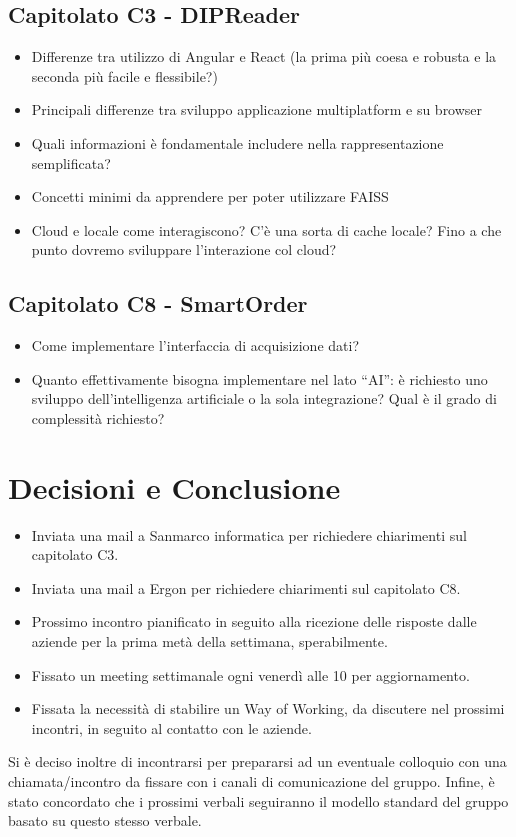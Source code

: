 \documentclass[a4paper,12pt]{article}
\begin{document}
\subsection{Capitolato C3 - DIPReader}
\begin{itemize}
    \item Differenze tra utilizzo di Angular e React (la prima più coesa e robusta e la seconda più facile e flessibile?)
    \item Principali differenze tra sviluppo applicazione multiplatform e su browser
    \item Quali informazioni è fondamentale includere nella rappresentazione semplificata?
    \item Concetti minimi da apprendere per poter utilizzare FAISS
    \item Cloud e locale come interagiscono? C'è una sorta di cache locale? Fino a che punto dovremo sviluppare l'interazione col cloud?
\end{itemize}

\subsection{Capitolato C8 - SmartOrder}
\begin{itemize}
    \item Come implementare l'interfaccia di acquisizione dati?
    \item Quanto effettivamente bisogna implementare nel lato “AI”: è richiesto uno sviluppo dell’intelligenza artificiale o la sola integrazione? Qual è il grado di complessità richiesto?
\end{itemize}

\vspace{0.5cm}
\section{Decisioni e Conclusione}
\begin{itemize}
    \item Inviata una mail a Sanmarco informatica per richiedere chiarimenti sul capitolato C3.
    \item Inviata una mail a Ergon per richiedere chiarimenti sul capitolato C8.
    \item Prossimo incontro pianificato in seguito alla ricezione delle risposte dalle aziende per la prima metà della settimana, sperabilmente.
    \item Fissato un meeting settimanale ogni venerdì alle 10 per aggiornamento.
    \item Fissata la necessità di stabilire un Way of Working, da discutere nel prossimi incontri, in seguito al contatto con le aziende.
\end{itemize}
Si è deciso inoltre di incontrarsi per prepararsi ad un eventuale colloquio con una chiamata/incontro da fissare con i canali di comunicazione del gruppo.
Infine, è stato concordato che i prossimi verbali seguiranno il modello standard del gruppo basato su questo stesso verbale.
\end{document}
